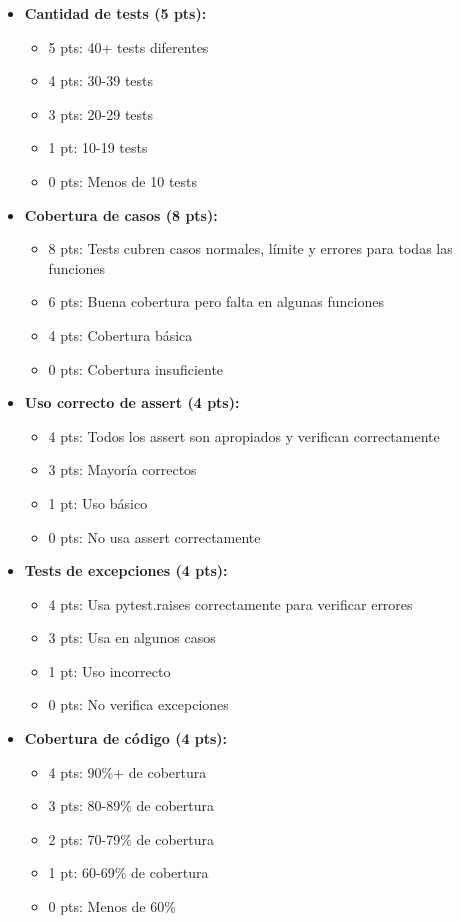 \documentclass[12pt,a4paper]{article}
\begin{document}
\begin{itemize}[leftmargin=*]
    \item \textbf{Cantidad de tests (5 pts):}
    \begin{itemize}
        \item 5 pts: 40+ tests diferentes
        \item 4 pts: 30-39 tests
        \item 3 pts: 20-29 tests
        \item 1 pt: 10-19 tests
        \item 0 pts: Menos de 10 tests
    \end{itemize}
    
    \item \textbf{Cobertura de casos (8 pts):}
    \begin{itemize}
        \item 8 pts: Tests cubren casos normales, límite y errores para todas las funciones
        \item 6 pts: Buena cobertura pero falta en algunas funciones
        \item 4 pts: Cobertura básica
        \item 0 pts: Cobertura insuficiente
    \end{itemize}
    
    \item \textbf{Uso correcto de assert (4 pts):}
    \begin{itemize}
        \item 4 pts: Todos los assert son apropiados y verifican correctamente
        \item 3 pts: Mayoría correctos
        \item 1 pt: Uso básico
        \item 0 pts: No usa assert correctamente
    \end{itemize}
    
    \item \textbf{Tests de excepciones (4 pts):}
    \begin{itemize}
        \item 4 pts: Usa pytest.raises correctamente para verificar errores
        \item 3 pts: Usa en algunos casos
        \item 1 pt: Uso incorrecto
        \item 0 pts: No verifica excepciones
    \end{itemize}
    
    \item \textbf{Cobertura de código (4 pts):}
    \begin{itemize}
        \item 4 pts: 90\%+ de cobertura
        \item 3 pts: 80-89\% de cobertura
        \item 2 pts: 70-79\% de cobertura
        \item 1 pt: 60-69\% de cobertura
        \item 0 pts: Menos de 60\%
    \end{itemize}
\end{itemize}
\end{document}

